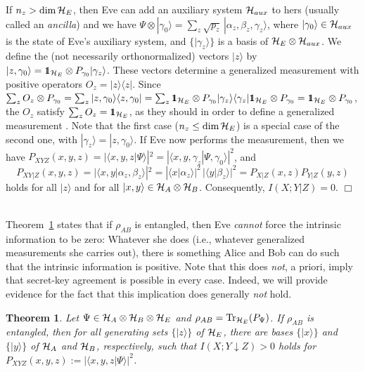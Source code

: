 \documentclass{article}
\newtheorem{theo}{Theorem}
\newcommand{\Tr}{{\rm Tr}}
\newcommand{\HA}{{\cal H}_{{A}}}
\newcommand{\HB}{{\cal H}_{{B}}}
\newcommand{\HE}{{\cal H}_{{E}}}
\newcommand{\peon}{\hspace*{\fill} $\Box$\\}
\def\down{\downarrow}
\def\opone{\leavevmode\hbox{\small1\kern-3.8pt\normalsize1}}
\def\H{{\cal H}}
\begin{document}
If $n_z> \dim\HE$, then Eve can add an auxiliary system $\H_{aux}$
to hers (usually called an {\em ancilla\/}) and we have
$
\Psi\otimes|\gamma_0\rangle=\sum_z \sqrt{p_z}\,
|\alpha_z,\beta_z,\gamma_z\rangle
$,
where $|\gamma_0\rangle\in\H_{aux}$ is the state of Eve's auxiliary
system, and 
$\{|\gamma_z\rangle\}$ is a basis of $\HE\otimes\H_{aux}$.
We define the (not necessarily orthonormalized) vectors $|z\rangle$ by 
$|z,\gamma_0\rangle=\opone_{\HE}\otimes P_{\gamma_0}|\gamma_z\rangle$.
These vectors determine a generalized measurement with positive operators
$O_z=|z\rangle\langle z|$.
Since $\sum_zO_z\otimes
P_{\gamma_0}=\sum_z|z,\gamma_0\rangle\langle z,\gamma_0|
=\sum_z\opone_{\HE}\otimes
P_{\gamma_0}|\gamma_z\rangle\langle\gamma_z| \opone_{\HE}\otimes
P_{\gamma_0}
=\opone_{\HE}\otimes P_{\gamma_0}$, the $O_z$ satisfy
$\sum_zO_z=\opone_{\HE}$, as 
they should in order to define a generalized measurement \cite{Peresbook}.
Note that the first case ($n_z\le \dim\HE$) is a special case of the
second one, with $|\gamma_z\rangle=|z,\gamma_0\rangle$.
If Eve now performs the measurement, then we have $P_{XYZ}(x,y,z)=|\langle
x,y,z|\Psi\rangle |^2
=|\langle x,y,\gamma_z|\Psi,\gamma_0\rangle |^2$, and
\[
P_{XY|Z}(x,y,z)=|\langle x,y|\alpha_z,\beta_z\rangle |^2
=|\langle x|\alpha_z\rangle |^2\, |\langle y|\beta_z\rangle
|^2=P_{X|Z}(x,z)P_{Y|Z}
(y,z)
\]
holds for all $|z\rangle$ and for all
$|x,y\rangle \in\HA\otimes\HB$. Consequently, $I(X;Y|Z)=0$.
\peon 
\ 

Theorem~\ref{theozwei} states that 
 if $\rho_{AB}$ is  entangled,
   then Eve {\em cannot\/} force the intrinsic information to be zero: Whatever
   she does (i.e., whatever generalized measurements she carries out), there 
   is something Alice and Bob can do such that the intrinsic information
   is positive. Note that this does {\em not}, a priori, imply that secret-key
   agreement is possible in every case. Indeed, we will provide 
   evidence for the fact that this implication does generally {\em not\/}
   hold.    

\begin{theo}\label{theozwei}
Let $\Psi\in\HA\otimes\HB\otimes\HE$ and $\rho_{AB}=\Tr_{\HE}(P_{\Psi})$.
If $\rho_{AB}$ is entangled,
then for all generating sets $\{|z\rangle\} $ of $\HE$, 
there are bases $\{|x\rangle\} $ and $\{|y\rangle\} $ of $\HA$ and $\HB$, 
respectively,
such that
$I(X;Y\down Z)>0$
holds for
 $P_{XYZ}(x,y,z):=|\langle x,y,z|\Psi\rangle |^2$.
\end{theo}
\end{document}
